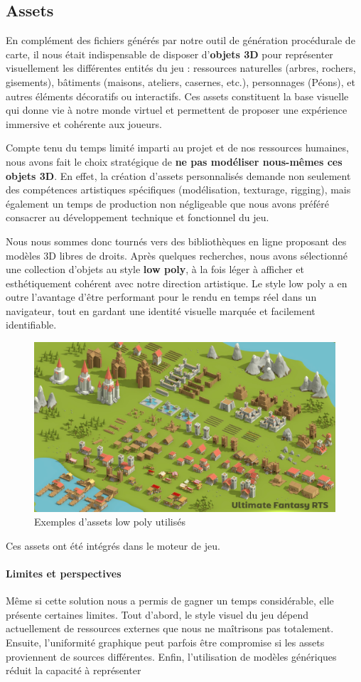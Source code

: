\subsection{Assets}

En complément des fichiers générés par notre outil de génération procédurale de carte, il nous était indispensable de disposer d’\textbf{objets 3D} pour représenter visuellement les différentes entités du jeu : ressources naturelles (arbres, rochers, gisements), bâtiments (maisons, ateliers, casernes, etc.), personnages (Péons), et autres éléments décoratifs ou interactifs. Ces assets constituent la base visuelle qui donne vie à notre monde virtuel et permettent de proposer une expérience immersive et cohérente aux joueurs.

Compte tenu du temps limité imparti au projet et de nos ressources humaines, nous avons fait le choix stratégique de \textbf{ne pas modéliser nous-mêmes ces objets 3D}. En effet, la création d’assets personnalisés demande non seulement des compétences artistiques spécifiques (modélisation, texturage, rigging), mais également un temps de production non négligeable que nous avons préféré consacrer au développement technique et fonctionnel du jeu.

Nous nous sommes donc tournés vers des bibliothèques en ligne proposant des modèles 3D libres de droits. Après quelques recherches, nous avons sélectionné une collection d’objets au style \textbf{low poly}, à la fois léger à afficher et esthétiquement cohérent avec notre direction artistique. Le style low poly a en outre l’avantage d’être performant pour le rendu en temps réel dans un navigateur, tout en gardant une identité visuelle marquée et facilement identifiable.

\begin{figure}[!h]
    \centering
    \includegraphics[width=0.5\linewidth]{images/assets.png}
    \caption{Exemples d'assets low poly utilisés}
    \label{fig:assets}
\end{figure}

Ces assets ont été intégrés dans le moteur de jeu.

\paragraph{Limites et perspectives}

Même si cette solution nous a permis de gagner un temps considérable, elle présente certaines limites. Tout d’abord, le style visuel du jeu dépend actuellement de ressources externes que nous ne maîtrisons pas totalement. Ensuite, l’uniformité graphique peut parfois être compromise si les assets proviennent de sources différentes. Enfin, l’utilisation de modèles génériques réduit la capacité à représenter


